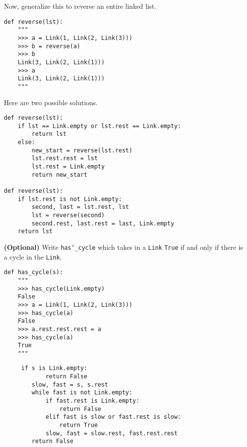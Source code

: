 \documentclass{exam}
\begin{document}
\begin{questions}
\begin{blocksection}
Now, generalize this to reverse an entire linked list.
\begin{lstlisting}
def reverse(lst):
    """
    >>> a = Link(1, Link(2, Link(3)))
    >>> b = reverse(a)
    >>> b
    Link(3, Link(2, Link(1)))
    >>> a
    Link(3, Link(2, Link(1)))
    """
\end{lstlisting}
\begin{solution}[1.25in]
Here are two possible solutions.
\begin{lstlisting}
def reverse(lst):
    if lst == Link.empty or lst.rest == Link.empty:
        return lst
    else:
        new_start = reverse(lst.rest)
        lst.rest.rest = lst
        lst.rest = Link.empty
        return new_start

def reverse(lst):
    if lst.rest is not Link.empty:
        second, last = lst.rest, lst
        lst = reverse(second)
        second.rest, last.rest = last, Link.empty
    return lst
\end{lstlisting}
\end{solution}


\end{blocksection}

\begin{blocksection}
\question \textbf{(Optional)} Write \texttt{has\char`_cycle} which takes in a
\texttt{Link} \texttt{True} if and only if there is a cycle in the
\texttt{Link}.

\begin{lstlisting}
def has_cycle(s):
    """
    >>> has_cycle(Link.empty)
    False
    >>> a = Link(1, Link(2, Link(3)))
    >>> has_cycle(a)
    False
    >>> a.rest.rest.rest = a
    >>> has_cycle(a)
    True
    """
\end{lstlisting}

\begin{solution}
\begin{lstlisting}
     if s is Link.empty:
            return False
        slow, fast = s, s.rest
        while fast is not Link.empty:
            if fast.rest is Link.empty:
                return False
            elif fast is slow or fast.rest is slow:
                return True
            slow, fast = slow.rest, fast.rest.rest
        return False
\end{lstlisting}
\end{solution}

\end{blocksection}

\end{questions}

\end{document}
